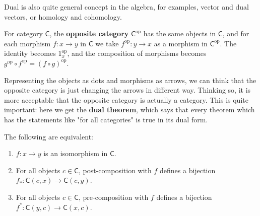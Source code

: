 Dual is also quite general concept in the algebra, for examples, vector and dual vectors, or homology and cohomology.
\begin{defn} For category $\mathsf{C}$, the \textbf{opposite category} $\mathsf{C}^{\mathrm{op}}$ has the same objects in $\mathsf{C}$, and for each morphism $f:x\rightarrow y$ in $\mathsf{C}$ we take $f^{\mathrm{op}}:y\rightarrow x$ as a morphism in $\mathsf{C}^{\mathrm{op}}$. The identity becomes $1_x^{\mathrm{op}}$, and the composition of morphisms becomes $g^{\mathrm{op}}\circ f^{\mathrm{op}}=(f\circ g)^{\mathrm{op}}$.
\end{defn}
Representing the objects as dots and morphisms as arrows, we can think that the opposite category is just changing the arrows in different way. Thinking so, it is more acceptable that the opposite category is actually a category. This is quite important: here we get the \textbf{dual theorem}, which says that every theorem which has the statements like "for all categories" is true in its dual form.
\begin{lemma} The following are equivalent:
\begin{enumerate}
\item $f:x\rightarrow y$ is an isomorphism in $\mathsf{C}$.
\item For all objects $c\in \mathsf{C}$, post-composition with $f$ defines a bijection $f_*:\mathsf{C}(c,x)\rightarrow \mathsf{C}(c,y)$.
\item For all objects $c\in \mathsf{C}$, pre-composition with $f$ defines a bijection $f^*:\mathsf{C}(y,c)\rightarrow \mathsf{C}(x,c)$.
\end{enumerate}
\end{lemma}
